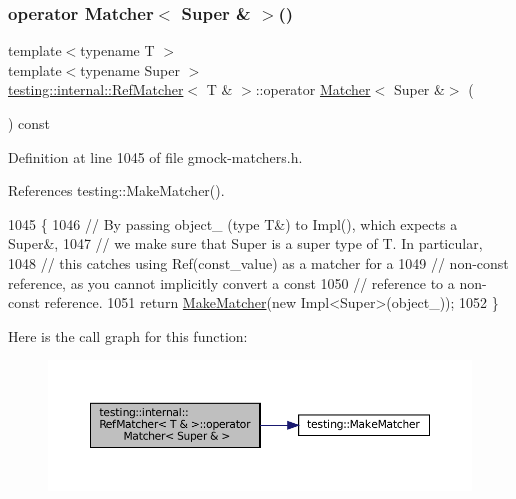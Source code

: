 \mbox{\label{classtesting_1_1internal_1_1RefMatcher_3_01T_01_6_01_4_ac146f2d10f0b2e361f903225be15d1a9}} 
\subsubsection{\texorpdfstring{operator Matcher$<$ Super \& $>$()}{operator Matcher< Super \& >()}}
{\footnotesize\ttfamily template$<$typename T $>$ \\
template$<$typename Super $>$ \\
\hyperlink{classtesting_1_1internal_1_1RefMatcher}{testing\+::internal\+::\+Ref\+Matcher}$<$ T \& $>$\+::operator \hyperlink{classtesting_1_1Matcher}{Matcher}$<$ Super \&$>$ (\begin{DoxyParamCaption}{ }\end{DoxyParamCaption}) const\hspace{0.3cm}{\ttfamily [inline]}}



Definition at line 1045 of file gmock-\/matchers.\+h.



References testing\+::\+Make\+Matcher().


\begin{DoxyCode}
1045                                    \{
1046     \textcolor{comment}{// By passing object\_ (type T&) to Impl(), which expects a Super&,}
1047     \textcolor{comment}{// we make sure that Super is a super type of T.  In particular,}
1048     \textcolor{comment}{// this catches using Ref(const\_value) as a matcher for a}
1049     \textcolor{comment}{// non-const reference, as you cannot implicitly convert a const}
1050     \textcolor{comment}{// reference to a non-const reference.}
1051     \textcolor{keywordflow}{return} \hyperlink{namespacetesting_a37fd8029ac00e60952440a3d9cca8166}{MakeMatcher}(\textcolor{keyword}{new} Impl<Super>(object\_));
1052   \}
\end{DoxyCode}
Here is the call graph for this function\+:
\nopagebreak
\begin{figure}[H]
\begin{center}
\leavevmode
\includegraphics[width=350pt]{classtesting_1_1internal_1_1RefMatcher_3_01T_01_6_01_4_ac146f2d10f0b2e361f903225be15d1a9_cgraph}
\end{center}
\end{figure}


